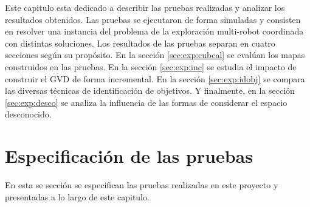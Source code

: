 






Este capitulo esta dedicado a describir las pruebas realizadas y analizar los
resultados obtenidos. Las pruebas se ejecutaron de forma simuladas y consisten
en resolver una instancia del problema de la exploración multi-robot coordinada
con distintas soluciones.
Los resultados de las pruebas separan en cuatro secciones según su propósito.
En la sección \ref{sec:exp:cubcal} se evalúan los mapas construidos en las
pruebas. En la sección \ref{sec:exp:inc} se estudia el impacto de construir el
GVD de forma incremental. En la sección \ref{sec:exp:idobj} se compara las
diversas técnicas de identificación de objetivos. Y finalmente, en la sección
\ref{sec:exp:desco} se analiza la influencia de las formas de considerar el
espacio desconocido. 

\section{Especificación de las pruebas}

En esta se sección se especifican las pruebas realizadas en este
proyecto y presentadas a lo largo de este capitulo.

